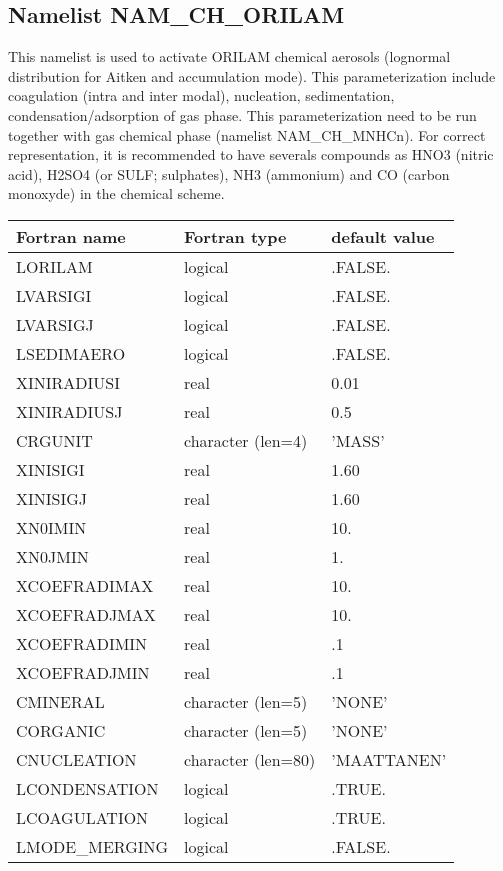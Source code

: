 
\subsection{Namelist NAM\_CH\_ORILAM }
 
This namelist is used to activate ORILAM chemical aerosols (lognormal distribution for Aitken and accumulation mode).
This parameterization include coagulation (intra and inter modal), nucleation,  sedimentation, condensation/adsorption of gas phase.
 This parameterization need to be run together with gas chemical phase (namelist NAM\_CH\_MNHCn). 
For correct representation, it is recommended to have severals compounds as HNO3 (nitric acid), H2SO4 (or SULF; sulphates), NH3 (ammonium) and CO (carbon monoxyde) in the chemical scheme. 

\begin{longtable} {|p{}|p{}|p{}|}
\hline
Fortran name &  Fortran type & default value \\
\hline 
\endhead
\hline
\endfoot
LORILAM     & logical  & .FALSE.  \\
LVARSIGI    & logical  & .FALSE. \\
LVARSIGJ    & logical  & .FALSE.  \\
LSEDIMAERO  & logical  & .FALSE.  \\
XINIRADIUSI & real     & 0.01  \\
XINIRADIUSJ & real     & 0.5  \\
CRGUNIT     & character (len=4)  & 'MASS'   \\
XINISIGI    & real     & 1.60  \\
XINISIGJ    & real     & 1.60  \\
XN0IMIN     & real     &  10.  \\
XN0JMIN     & real     &  1.   \\
XCOEFRADIMAX& real     &  10.  \\
XCOEFRADJMAX& real     &  10.  \\
XCOEFRADIMIN& real     &  .1  \\
XCOEFRADJMIN& real     &  .1  \\
CMINERAL    & character (len=5)  & 'NONE'   \\
CORGANIC    & character (len=5)  & 'NONE'   \\
CNUCLEATION & character (len=80) & 'MAATTANEN'   \\
LCONDENSATION & logical & .TRUE. \\
LCOAGULATION & logical & .TRUE. \\
LMODE\_MERGING & logical & .FALSE. \\
\end{longtable}


